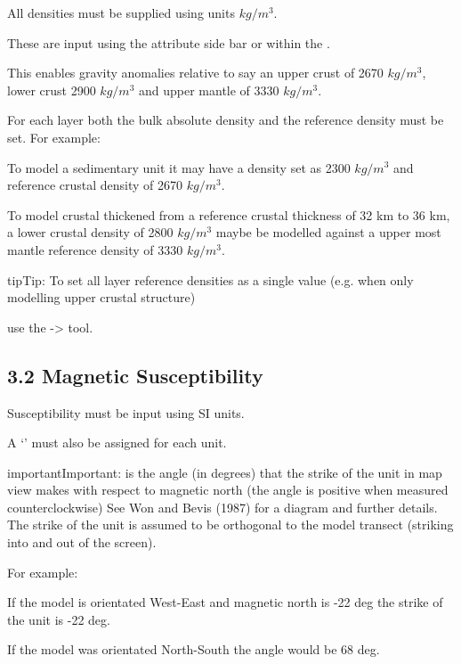 \documentclass[a4paper,12pt,english]{sphinxmanual}
\begin{document}
All densities must be supplied using units \(kg/m^3\).

These are input using the attribute side bar or within the .

This enables gravity anomalies relative to say an upper crust of 2670 \(kg/m^3\), lower crust 2900 \(kg/m^3\)
and upper mantle of 3330 \(kg/m^3\).

For each layer both the bulk absolute density and the reference density must be set. For example:

To model a sedimentary unit it may have a density set as 2300 \(kg/m^3\) and reference crustal
density of 2670 \(kg/m^3\).

To model crustal thickened from a reference crustal thickness of 32 km to 36 km, a lower crustal density of
2800 \(kg/m^3\) maybe be modelled against a upper most mantle reference density of 3330 \(kg/m^3\).

\begin{sphinxadmonition}{tip}{Tip:}
To set all layer reference densities as a single value (e.g. when only modelling upper crustal structure)
\end{sphinxadmonition}

use the  -\textgreater{}  tool.

\begin{DUlineblock}{0em}
\item[] 
\end{DUlineblock}


\subsection{3.2 Magnetic Susceptibility}
\label{\detokenize{manual__layer_attributes:magnetic-susceptibility}}
Susceptibility must be input using SI units.

A ‘’ must also be assigned for each unit.

\begin{sphinxadmonition}{important}{Important:}
 is the angle (in degrees) that the strike of the unit in map view makes with respect to magnetic north
(the angle is positive when measured counterclockwise) See Won and Bevis (1987) for a diagram and further details.
The strike of the unit is assumed to be orthogonal to the model transect (striking into and out of the screen).

For example:

If the model is orientated West-East and magnetic north is -22 deg the strike of the unit is -22 deg.

If the model was orientated North-South the angle would be 68 deg.
\end{sphinxadmonition}
\end{document}
